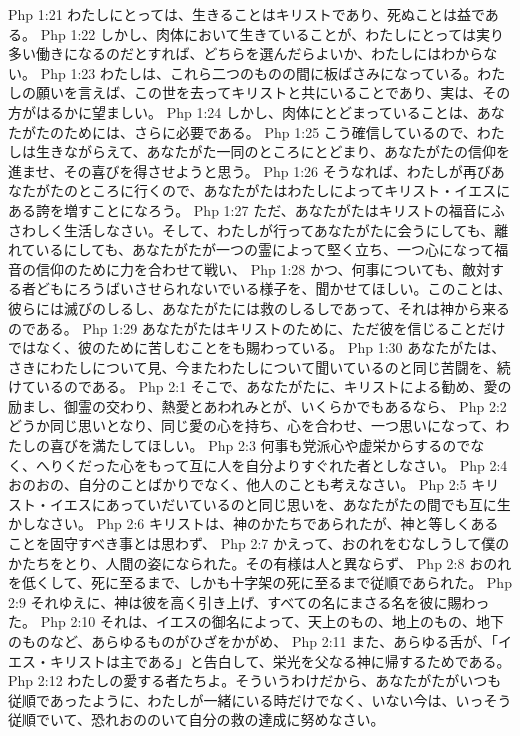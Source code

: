 Php 1:21  わたしにとっては、生きることはキリストであり、死ぬことは益である。
Php 1:22  しかし、肉体において生きていることが、わたしにとっては実り多い働きになるのだとすれば、どちらを選んだらよいか、わたしにはわからない。
Php 1:23  わたしは、これら二つのものの間に板ばさみになっている。わたしの願いを言えば、この世を去ってキリストと共にいることであり、実は、その方がはるかに望ましい。
Php 1:24  しかし、肉体にとどまっていることは、あなたがたのためには、さらに必要である。
Php 1:25  こう確信しているので、わたしは生きながらえて、あなたがた一同のところにとどまり、あなたがたの信仰を進ませ、その喜びを得させようと思う。
Php 1:26  そうなれば、わたしが再びあなたがたのところに行くので、あなたがたはわたしによってキリスト・イエスにある誇を増すことになろう。
Php 1:27  ただ、あなたがたはキリストの福音にふさわしく生活しなさい。そして、わたしが行ってあなたがたに会うにしても、離れているにしても、あなたがたが一つの霊によって堅く立ち、一つ心になって福音の信仰のために力を合わせて戦い、
Php 1:28  かつ、何事についても、敵対する者どもにろうばいさせられないでいる様子を、聞かせてほしい。このことは、彼らには滅びのしるし、あなたがたには救のしるしであって、それは神から来るのである。
Php 1:29  あなたがたはキリストのために、ただ彼を信じることだけではなく、彼のために苦しむことをも賜わっている。
Php 1:30  あなたがたは、さきにわたしについて見、今またわたしについて聞いているのと同じ苦闘を、続けているのである。
Php 2:1  そこで、あなたがたに、キリストによる勧め、愛の励まし、御霊の交わり、熱愛とあわれみとが、いくらかでもあるなら、
Php 2:2  どうか同じ思いとなり、同じ愛の心を持ち、心を合わせ、一つ思いになって、わたしの喜びを満たしてほしい。
Php 2:3  何事も党派心や虚栄からするのでなく、へりくだった心をもって互に人を自分よりすぐれた者としなさい。
Php 2:4  おのおの、自分のことばかりでなく、他人のことも考えなさい。
Php 2:5  キリスト・イエスにあっていだいているのと同じ思いを、あなたがたの間でも互に生かしなさい。
Php 2:6  キリストは、神のかたちであられたが、神と等しくあることを固守すべき事とは思わず、
Php 2:7  かえって、おのれをむなしうして僕のかたちをとり、人間の姿になられた。その有様は人と異ならず、
Php 2:8  おのれを低くして、死に至るまで、しかも十字架の死に至るまで従順であられた。
Php 2:9  それゆえに、神は彼を高く引き上げ、すべての名にまさる名を彼に賜わった。
Php 2:10  それは、イエスの御名によって、天上のもの、地上のもの、地下のものなど、あらゆるものがひざをかがめ、
Php 2:11  また、あらゆる舌が、「イエス・キリストは主である」と告白して、栄光を父なる神に帰するためである。
Php 2:12  わたしの愛する者たちよ。そういうわけだから、あなたがたがいつも従順であったように、わたしが一緒にいる時だけでなく、いない今は、いっそう従順でいて、恐れおののいて自分の救の達成に努めなさい。
